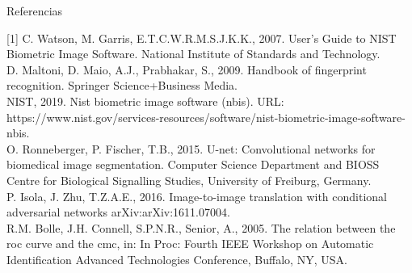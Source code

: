 \documentclass[12pt,aspectratio=169]{beamer}
\begin{document}
\begin{frame}{Referencias}

{\tiny
[1] C. Watson, M. Garris, E.T.C.W.R.M.S.J.K.K., 2007. User’s Guide to
NIST Biometric Image Software. National Institute of Standards and
Technology.\\
[2] D. Maltoni, D. Maio, A.J., Prabhakar, S., 2009. Handbook of fingerprint recognition. Springer Science+Business Media.\\
[3] NIST, 2019. Nist biometric image software (nbis).
URL: https://www.nist.gov/services-resources/software/nist-biometric-image-software-nbis.\\
[4] O. Ronneberger, P. Fischer, T.B., 2015. U-net: Convolutional networks
for biomedical image segmentation. Computer Science Department and BIOSS Centre for Biological Signalling Studies, University of Freiburg, Germany.\\
[5] P. Isola, J. Zhu, T.Z.A.E., 2016. Image-to-image translation with conditional adversarial networks arXiv:arXiv:1611.07004.\\
[6] R.M. Bolle, J.H. Connell, S.P.N.R., Senior, A., 2005. The relation between the roc curve and the cmc, in: In Proc: Fourth IEEE Workshop on Automatic Identification Advanced Technologies Conference, Buffalo,
NY, USA.
}
    
\end{frame}
\end{document}
